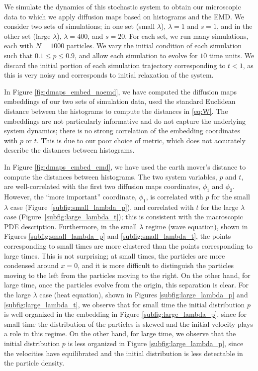 \documentclass[prl, reprint, final, showkeys]{revtex4-1}
\begin{document}
We simulate the dynamics of this stochastic system to obtain our microscopic data to which we apply diffusion maps based on histograms and the EMD.
%
We consider two sets of simulations;
in one set (small $\lambda$), $\lambda = 1$ and $s=1$, and in the other set (large $\lambda$), $\lambda = 400$, and $s=20$.
%
For each set, we run many simulations, each with $N=1000$ particles.
%
We vary the initial condition of each simulation such that $0.1 \le p  \le 0.9$, and allow each simulation to evolve for $10$ time units.
%
We discard the initial portion of each simulation trajectory corresponding to $t < 1$, as this is very noisy and corresponds to initial relaxation of the system.

In Figure \ref{fig:dmaps_embed_noemd}, we have computed the diffusion maps embeddings of our two sets of simulation data, used the standard Euclidean distance between the histograms to compute the distances in \eqref{eq:W}.
%
The embeddings are not particularly informative and do not capture the underlying system dynamics; there is no strong correlation of the embedding coordinates with $p$ or $t$. 
%
This is due to our poor choice of metric, which does not accurately describe the distances between histograms.

In Figure \ref{fig:dmaps_embed_emd}, we have used the earth mover's distance to compute the distances between histograms.
%
The two system variables, $p$ and $t$, are well-correlated with the first two diffusion maps coordinates, $\phi_1$ and $\phi_2$. 
%
However, the ``more important'' coordinate, $\phi_1$, is correlated with $p$ for the small $\lambda$ case (Figure~\ref{subfig:small_lambda_p}), and correlated with $t$ for the large $\lambda$ case (Figure~\ref{subfig:large_lambda_t}); 
this is consistent with the macroscopic PDE description.
%
Furthermore, in the small $\lambda$ regime (wave equation), shown in Figures \ref{subfig:small_lambda_p} and \ref{subfig:small_lambda_t}, the points corresponding to small times are more clustered than the points corresponding to large times.
%
This is not surprising; at small times, the particles are more condensed around $x=0$, and it is more difficult to distinguish the particles moving to the left from the particles moving to the right. 
%
On the other hand, for large time, once the particles evolve from the origin, this separation is clear.  
%
For the large $\lambda$ case (heat equation), shown in Figures \ref{subfig:large_lambda_p} and \ref{subfig:large_lambda_t}, we observe that for small time the initial distribution $p$ is well organized in the embedding in Figure \ref{subfig:large_lambda_p}, since for small time the distribution of the particles is skewed and the initial velocity plays a role in this regime. 
%
On the other hand, for large time, we observe that the initial distribution $p$ is less organized in Figure \ref{subfig:large_lambda_p}, since the velocities have equilibrated and the initial distribution is less detectable in the particle density.
\end{document}
